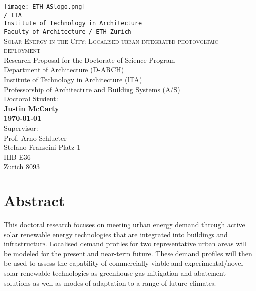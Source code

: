 
\begin{titlepage}
\vspace*{-2.5cm}
\hspace*{-1cm}

\noindent
\texttt{[image: ETH\_ASlogo.png]}\\


\noindent
\texttt{\textcolor{suatblue}{/ ITA\\
	Institute of Technology in Architecture\\
	Faculty of Architecture / ETH Zurich}}\\[0.1cm]


\noindent
\textsc{\LARGE  Solar Energy in the City:
Localised urban integrated photovoltaic deployment}\\[0.1cm]

\noindent
Research Proposal for the Doctorate of Science Program\\
Department of Architecture (D-ARCH)\\
Institute of Technology in Architecture (ITA)\\
Professorship of Architecture and Building Systems (A/S)\\[0.1cm]

\noindent
Doctoral Student:\\
\textbf{Justin McCarty \\ \today}\\[0.05cm]

\noindent
Supervisor:\\
Prof. Arno Schlueter\\
Stefano-Franscini-Platz 1 \\
HIB E36 \\
Zurich 8093 \\

\section*{Abstract}

This doctoral research focuses on meeting urban energy demand through active solar renewable energy technologies that are integrated into buildings and infrastructure. Localised demand profiles for two representative urban areas will be modeled for the present and near-term future. These demand profiles will then be used to assess the capability of commercially viable and experimental/novel solar renewable technologies as greenhouse gas mitigation and abatement solutions as well as modes of adaptation to a range of future climates. 


\end{titlepage}
